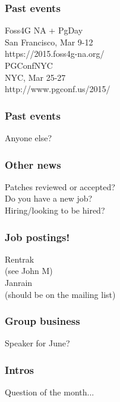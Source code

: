 \documentclass{beamer}
\begin{document}
\frame
{
  \frametitle{Past events}
  \begin{center}
{\large Foss4G NA + PgDay\\}
San Francisco, Mar 9-12\\
https://2015.foss4g-na.org/\\
\vspace{5mm}
{\large PGConfNYC\\}
NYC, Mar 25-27\\
http://www.pgconf.us/2015/\\
\vspace{5 mm}
  \end{center}
}

\frame
{
  \frametitle{Past events}
  \begin{center}
Anyone else?\\
  \end{center}
}

\frame
{
  \frametitle{Other news}
  \begin{center}
Patches reviewed or accepted?\\
Do you have a new job?\\
Hiring/looking to be hired?\\
  \end{center}
}

\frame
{
  \frametitle{Job postings!}
  \begin{center}
Rentrak\\
(see John M)\\
Janrain\\
(should be on the mailing list)\\

  \end{center}
}

\frame
{
  \frametitle{Group business}
  \begin{center}
Speaker for June?\\
  \end{center}
}

\frame
{
  \frametitle{Intros}
  \begin{center}
Question of the month...\\
  \end{center}
}
\end{document}

